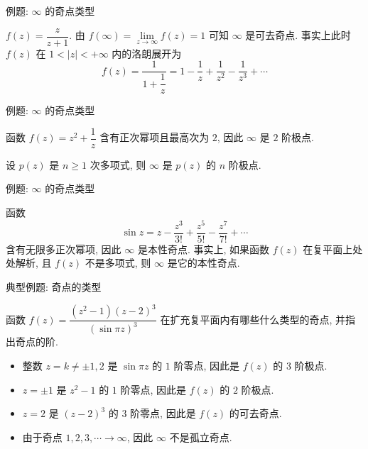 \begin{frame}{例题: $\infty$ 的奇点类型}
\begin{example}
$f(z)=\dfrac z{z+1}$.
\onslide<+->
由 $f(\infty)=\lim\limits_{z\to\infty}f(z)=1$ 可知 $\infty$ 是可去奇点.
\onslide<+->
事实上此时 $f(z)$ 在 $1<|z|<+\infty$ 内的洛朗展开为
\[f(z)=\frac{1}{1+\dfrac1z}=1-\frac1z+\frac1{z^2}-\frac1{z^3}+\cdots\]
\end{example}
\end{frame}


\begin{frame}{例题: $\infty$ 的奇点类型}
\begin{example}
函数 $f(z)=z^2+\dfrac1z$
\onslide<+->
含有正次幂项且最高次为 $2$, 因此 $\infty$ 是 $2$ 阶极点.
\end{example}
\begin{example}
设 $p(z)$ 是 $n\ge1$ 次多项式,
\onslide<+->
则 $\infty$ 是 $p(z)$ 的 $n$ 阶极点.
\end{example}
\end{frame}


\begin{frame}{例题: $\infty$ 的奇点类型}
\begin{example}
函数 
\[\sin z=z-\frac{z^3}{3!}+\frac{z^5}{5!}-\frac{z^7}{7!}+\cdots\]\onslide<+->
含有无限多正次幂项,
\onslide<+->
因此 $\infty$ 是本性奇点.
\onslide<+->
事实上, 如果函数 $f(z)$ 在复平面上处处解析, 且 $f(z)$ 不是多项式, 则 $\infty$ 是它的本性奇点.
\end{example}
\end{frame}


\begin{frame}{典型例题: 奇点的类型}
\begin{example}
函数 $f(z)=\dfrac{(z^2-1)(z-2)^3}{(\sin{\pi z})^3}$ 在扩充复平面内有哪些什么类型的奇点, 并指出奇点的阶.
\end{example}
\begin{solution}
\begin{itemize}
\item 整数 $z=k\neq \pm1,2$ 是 $\sin{\pi z}$ 的 $1$ 阶零点, 因此是 $f(z)$ 的 3 阶极点.
\item $z=\pm1$ 是 $z^2-1$ 的 $1$ 阶零点, 因此是 $f(z)$ 的 $2$ 阶极点.
\item $z=2$ 是 $(z-2)^3$ 的 $3$ 阶零点, 因此是 $f(z)$ 的可去奇点.
\item 由于奇点 $1,2,3,\cdots\to \infty$, 因此 $\infty$ 不是孤立奇点.
\end{itemize}
\end{solution}
\end{frame}


